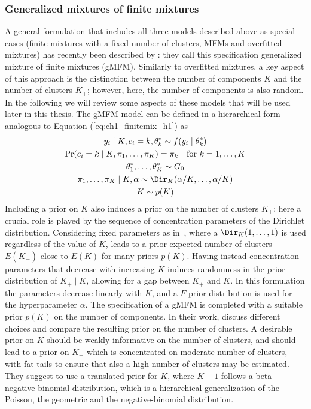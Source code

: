\subsubsection*{Generalized mixtures of finite mixtures}
A general formulation that includes all three models described above as special cases (finite mixtures with a fixed number of clusters, MFMs and overfitted mixtures) has recently been described by \citet{fruhwirthschnatter2020}: they call this specification generalized mixture of finite mixtures (gMFM). Similarly to overfitted mixtures, a key aspect of this approach is the distinction between the number of components $K$ and the number of clusters $K_+$; however, here, the number of components is also random. 
In the following we will review some aspects of these models that will be used later in this thesis.
The gMFM model can be defined in a hierarchical form analogous to Equation (\ref{eq:ch1_finitemix_h1}) as
\begin{equation*}
\begin{gathered}
y_i \mid K, c_i = k, \theta^*_k \sim f(y_i\mid\theta^*_k)\\
\Pr(c_i = k \mid K, \pi_1,\dots,\pi_K) = \pi_k \quad \text{for } k = 1,\dots,K\\ 
\theta^*_1,\dots,\theta^*_K \sim G_0\\
\pi_1,\dots,\pi_K \mid K, \alpha \sim \Dir_K(\alpha / K, \dots, \alpha / K)\\
K \sim p(K)
\end{gathered}
\label{eq:ch1_gMFM}
\end{equation*}
Including a prior on $K$ also induces a prior on the number of clusters $K_+$: here a crucial role is played by the sequence of concentration parameters of the Dirichlet distribution. Considering fixed parameters as in~\citet{miller2018}, where a $\Dir_K(1,\dots,1)$ is used regardless of the value of $K$, leads to a prior expected number of clusters $E(K_+)$ close to $E(K)$ for many priors $p(K)$. Having instead concentration parameters that decrease with increasing $K$ induces randomness in the prior distribution of $K_+\mid K$, allowing for a gap between $K_+$ and $K$. In this formulation the parameters decrease linearly with $K$, and a $F$ prior distribution is used for the hyperparameter $\alpha$.
The specification of a gMFM is completed with a suitable prior $p(K)$ on the number of components. In their work, \citet{fruhwirthschnatter2020} discuss different choices and compare the resulting prior on the number of clusters. 
A desirable prior on $K$ should be weakly informative on the number of clusters, and should lead to a prior on $K_+$ which is concentrated on moderate number of clusters, with fat tails to ensure that also a high number of clusters may be estimated. They suggest to use a translated prior for $K$, where $K-1$ follows a beta-negative-binomial distribution, which is a hierarchical generalization of the Poisson, the geometric and the negative-binomial distribution.

